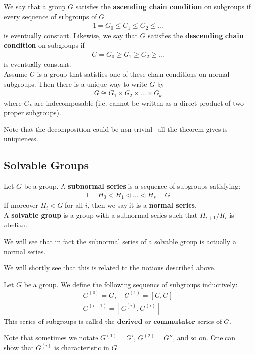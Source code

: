 \documentclass{memoir}
\begin{document}
\begin{thm}
	We say that a group \(G\) satisfies the \textbf{ascending chain condition} on subgroups if every sequence of subgroups of \(G\)
	\begin{align*}
		1 = G_0\leq G_1\leq G_2\leq \ldots
	\end{align*}
	is eventually constant. Likewise, we say that \(G\) satisfies the \textbf{descending chain condition} on subgroups if
	\begin{align*}
		G = G_0 \geq G_1 \geq G_2 \geq \ldots
	\end{align*}
	is eventually constant.\\

	Assume \(G\) is a group that satisfies one of these chain conditions on normal subgroups. Then there is a unique way to write \(G\) by
	\begin{align*}
		G \cong G_1 \times G_2 \times \ldots\times G_k
	\end{align*}
	where \(G_k\) are indecomposable (i.e. cannot be written as a direct product of two proper subgroups).
\end{thm}
Note that the decomposition could be non-trivial-- all the theorem gives is uniqueness.
\subsection{Solvable Groups}
\label{sub:solvable_groups}

\begin{defn}
	Let \(G\) be a group. A \textbf{subnormal series} is a sequence of subgroups satisfying:
	\begin{align*}
		1 = H_0 \triangleleft H_1 \triangleleft \ldots \triangleleft H_s = G
	\end{align*}
	If moreover \(H_i \triangleleft G\) for all \(i\), then we say it is a \textbf{normal series}.\\

	A \textbf{solvable group} is a group with a subnormal series such that  \(H_{i+1} / H_i\) is abelian.
\end{defn}
We will see that in fact the subnormal series of a solvable group is actually a normal series.


We will shortly see that this is related to the notions described above.

\begin{defn}
	Let \(G\) be a group. We define the following sequence of subgroups inductively:
	\begin{align*}
		G^{(0)}= G, \quad G^{(1)} = [G,G]\\
		G^{(i+1)}= [G^{(i)}, G^{(i)}]
	\end{align*}
	This series of subgroups is called the \textbf{derived} or \textbf{commutator} series of \(G\).
\end{defn}
Note that sometimes we notate \(G^{(1)}= G'\), \(G^{(2)} = G''\), and so on. One can show that \(G^{(i)}\) is characteristic in \(G\).\\
\end{document}
